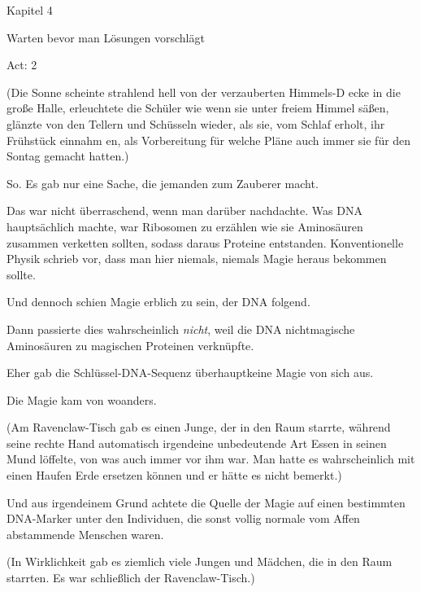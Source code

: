 

\hypertarget{warten-bevor-man-luxf6sungen-vorschluxe4gt}{%

Kapitel 4

Warten bevor man Lösungen vorschlägt

Act: 2

(Die Sonne scheinte strahlend hell von der verzauberten Himmels-D ecke in die große Halle, erleuchtete die Schüler wie wenn sie unter freiem Himmel säßen, glänzte von den Tellern und Schüsseln wieder, als sie, vom Schlaf erholt, ihr Frühstück einnahm en, als Vorbereitung für welche Pläne auch immer sie für den Sontag gemacht hatten.)

So. Es gab nur eine Sache, die jemanden zum Zauberer macht.

Das war nicht überraschend, wenn man darüber nachdachte. Was DNA hauptsächlich machte, war Ribosomen zu erzählen wie sie Aminosäuren zusammen verketten sollten, sodass daraus Proteine entstanden. Konventionelle Physik schrieb vor, dass man hier niemals, niemals Magie heraus bekommen sollte.

Und dennoch schien Magie erblich zu sein, der DNA folgend.

Dann passierte dies wahrscheinlich \emph{nicht}, weil die DNA nichtmagische Aminosäuren zu magischen Proteinen verknüpfte.

Eher gab die Schlüssel-DNA-Sequenz überhauptkeine Magie von sich aus.

Die Magie kam von woanders.

(Am Ravenclaw-Tisch gab es einen Junge, der in den Raum starrte, während seine rechte Hand automatisch irgendeine unbedeutende Art Essen in seinen Mund löffelte, von was auch immer vor ihm war. Man hatte es wahrscheinlich mit einen Haufen Erde ersetzen können und er hätte es nicht bemerkt.)

Und aus irgendeinem Grund achtete die Quelle der Magie auf einen bestimmten DNA-Marker unter den Individuen, die sonst vollig normale vom Affen abstammende Menschen waren.

(In Wirklichkeit gab es ziemlich viele Jungen und Mädchen, die in den Raum starrten. Es war schließlich der Ravenclaw-Tisch.)

}
